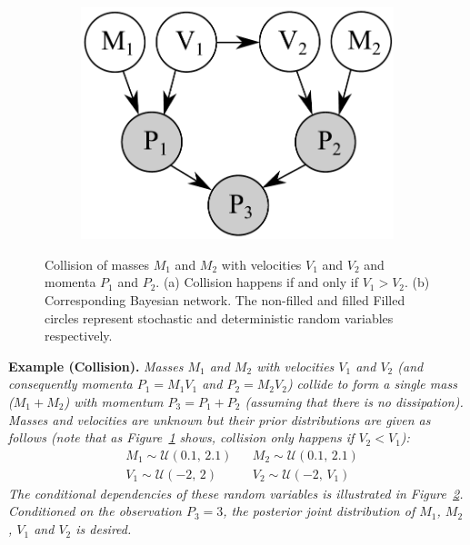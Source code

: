 \documentclass[letterpaper]{article}
\begin{document}
\begin{figure}
\begin{center}
\begin{center}
\begin{subfigure}{0.19\linewidth}
                \label{fig:mom0}
        \end{subfigure}%
\qquad
\begin{subfigure}{0.52\linewidth}
                \includegraphics[width=0.80\linewidth]{Figs/little-momentum1.pdf}
                \caption{}
                \label{fig:mom00}
        \end{subfigure}%
\end{center}
\vspace{-1mm}
\caption{\footnotesize 
Collision of masses $M_1$ and $M_2$ with velocities $V_1$ and $V_2$ and momenta $P_1$ and $P_2$. 
(a) Collision happens if and only if $V_1>V_2$. (b) Corresponding Bayesian network. The non-filled and filled Filled circles represent stochastic and deterministic random variables respectively.} 
\label{fig:mom2}
\vspace{-4mm}
\end{center}
\end{figure}

{\bf Example (Collision). }
\emph{Masses $M_1$ and $M_2$ with velocities $V_1$ and $V_2$ (and consequently momenta $P_1 = M_1 V_1$ and $P_2 = M_2 V_2$) collide to form a single mass ($M_1 + M_2$) with momentum $P_3 = P_1 + P_2$ (assuming that there is no dissipation).
Masses and velocities are unknown but 
their prior distributions are given as follows (note that as Figure~\ref{fig:mom0} shows, collision only happens if $V_2 < V_1$):  
}%
\begin{align*}
&M_1 \sim \mathcal{U}(0.1, \, 2.1) 
&&M_2 \sim \mathcal{U}(0.1, \, 2.1)
\\
&V_1 \sim \mathcal{U}(-2, \, 2)
&&V_2 \sim \mathcal{U}(-2, \, V_1)
\end{align*} 
\emph{
The conditional dependencies of these random variables is illustrated in 
Figure~\ref{fig:mom00}.
Conditioned on the observation $P_3 = 3$, the posterior joint distribution of $M_1$, $M_2$, $V_1$ and $V_2$ is desired. 
} %
\end{document}
